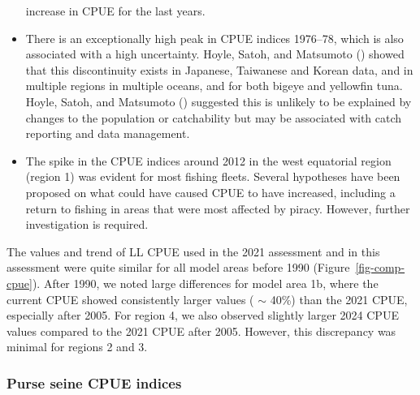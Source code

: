 \documentclass[
]{scrartcl}
\begin{document}
\begin{itemize}
  increase in CPUE for the last years.
\item
  There is an exceptionally high peak in CPUE indices 1976--78, which is
  also associated with a high uncertainty. Hoyle, Satoh, and Matsumoto
  () showed that
  this discontinuity exists in Japanese, Taiwanese and Korean data, and
  in multiple regions in multiple oceans, and for both bigeye and
  yellowfin tuna. Hoyle, Satoh, and Matsumoto
  () suggested this
  is unlikely to be explained by changes to the population or
  catchability but may be associated with catch reporting and data
  management.
\item
  The spike in the CPUE indices around 2012 in the west equatorial
  region (region 1) was evident for most fishing fleets. Several
  hypotheses have been proposed on what could have caused CPUE to have
  increased, including a return to fishing in areas that were most
  affected by piracy. However, further investigation is required.
\end{itemize}

The values and trend of LL CPUE used in the 2021 assessment and in this
assessment were quite similar for all model areas before 1990
(Figure~\ref{fig-comp-cpue}). After 1990, we noted large differences for
model area 1b, where the current CPUE showed consistently larger values
( \(\sim\) 40\%) than the 2021 CPUE, especially after 2005. For region
4, we also observed slightly larger 2024 CPUE values compared to the
2021 CPUE after 2005. However, this discrepancy was minimal for regions
2 and 3.

\subsubsection{Purse seine CPUE indices}\label{purse-seine-cpue-indices}
\end{document}

